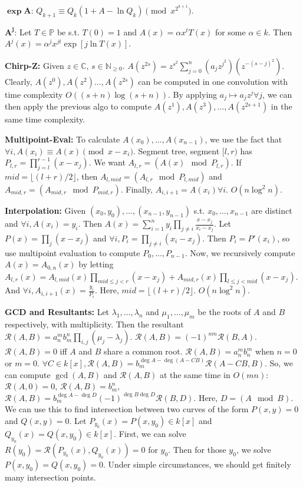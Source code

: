 $\mathbf{\exp{A}}$: $Q_{k+1} \equiv Q_k (1 + A - \ln{Q_k}) \pmod{x^{2^{k+1}}}$.

$\mathbf{A^j}$: Let $T \in \mathbb{P}$ be s.t. $T(0) = 1$ and $A(x) = \alpha x^t T(x)$ for some $\alpha \in k$. Then $A^j(x) = \alpha^j x^{jt} \exp{\left[ j \ln{T(x)} \right]}$.

\textbf{Chirp-Z:} Given $z \in \mathbb{C}$, $s \in \mathbb{N}_{\ge 0}$. $A\left(z^{2s}\right) = z^{s^2} \sum_{j=0}^n \left( a_j z^{j^2} \right) \left( z^{-(s-j)^2} \right)$. Clearly, $A(z^0), A(z^{2})\dots, A(z^{2s})$ can be computed in one convolution with time complexity $O\left((s + n) \log{\left(s + n\right)}\right)$. By applying $a_j \mapsto a_j z^j \forall j$, we can then apply the previous algo to compute $A(z^1), A(z^3), \dots, A(z^{2s+1})$ in the same time complexity.

\textbf{Multipoint-Eval:} To calculate $A(x_0), \dots, A(x_{n-1})$, we use the fact that $\forall i, A(x_i) \equiv A(x) \pmod{x - x_i}$. Segment tree, segment $[l,r)$ has $P_{l,r} = \prod_{j=l}^{r-1} (x - x_j)$. We want $A_{l,r} = \left( A(x) \mod{P_{l,r}} \right)$. If $mid=\lfloor (l+r)/2 \rfloor$, then $A_{l,mid} = \left( A_{l,r} \mod{P_{l,mid}} \right)$ and $A_{mid,r} = \left(A_{mid,r} \mod{P_{mid,r}}\right)$. Finally, $A_{i,i+1} = A(x_i) \forall i$. $O\left(n \log^2{n} \right)$.

\textbf{Interpolation:} Given $(x_0,y_0), \dots, (x_{n-1},y_{n-1})$ s.t. $x_0, \dots, x_{n-1}$ are distinct and $\forall i, A(x_i) = y_i$. Then $A(x) = \sum_{i=1}^n y_i \prod_{j \ne i} \frac{x - x_j}{x_i - x_j}$. Let $P(x) = \prod_j (x - x_j)$ and $\forall i, P_i = \prod_{j \ne i} \left(x_i - x_j \right)$. Then $P_i = P'(x_i)$, so use multipoint evaluation to compute $P_0, \dots, P_{n-1}$. Now, we recursively compute $A(x) = A_{0,n}(x)$ by letting $A_{l,r}(x) = A_{l,mid}(x) \prod_{mid \le j < r} \left(x - x_j\right) + A_{mid,r}(x) \prod_{l \le j < mid} \left( x - x_j \right)$. And $\forall i, A_{i,i+1}(x) = \frac{y_i}{P_i}$. Here, $mid = \lfloor (l + r) / 2 \rfloor$. $O\left(n \log^2{n} \right)$.

\textbf{GCD and Resultants:} Let $\lambda_1, \dots, \lambda_n$ and $\mu_1, \dots, \mu_m$ be the roots of $A$ and $B$ respectively, with multiplicity. Then the resultant $\mathcal{R}(A,B) = a^m_n b^n_m \prod_{i,j} \left( \mu_j - \lambda_j \right)$. $\mathcal{R}(A, B) = (-1)^{nm} \mathcal{R}(B, A)$. $\mathcal{R}(A,B) = 0$ iff $A$ and $B$ share a common root. $\mathcal{R}(A,B) = a^m_n b^m_n$ when $n = 0$ or $m = 0$. $\forall C \in k[x], \mathcal{R}(A, B) = b_m^{\deg{A} - \deg{\left(A - CB\right)}} \mathcal{R}(A - CB, B)$. So, we can compute $\gcd(A,B)$ and $\mathcal{R}(A,B)$ at the same time in $O(mn)$: $\mathcal{R}(A,0) = 0$, $\mathcal{R}(A,B) = b^n_m$, $\mathcal{R}(A,B) = b_m^{\deg{A} - \deg{D}} (-1)^{\deg{B}\deg{D}} \mathcal{R}\left(B, D\right)$. Here, $D = \left( A \mod{B} \right)$. We can use this to find intersection between two curves of the form $P(x,y) = 0$ and $Q(x,y) = 0$. Let $P_{y_0}(x) = P(x, y_0) \in k[x]$ and $Q_{y_0}(x) = Q(x, y_0) \in k[x]$. First, we can solve $R(y_0) = \mathcal{R}\left( P_{y_0}(x), Q_{y_0}(x) \right) = 0$ for $y_0$. Then for those $y_0$, we solve $P(x, y_0) = Q(x, y_0) = 0$. Under simple circumstances, we should get finitely many intersection points.

